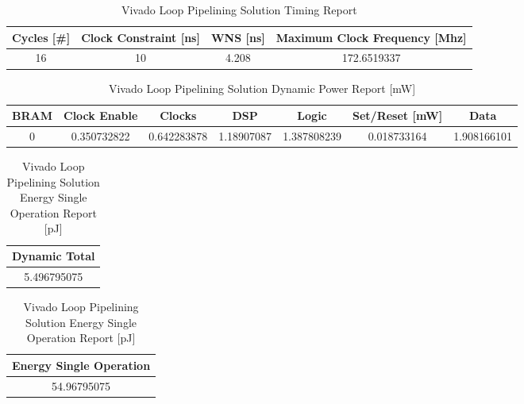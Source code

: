 \begin{table}[H]
    \centering
    \begin{tabular}{|c|c|c|c|}
        \hline
        \textbf{Cycles} [\#] & \textbf{Clock Constraint} [ns] & \textbf{WNS} [ns] & \textbf{Maximum Clock Frequency} [Mhz] \\
        \hline
        16 & 10 & 4.208 & 172.6519337 \\
        \hline
    \end{tabular}
    \caption{Vivado Loop Pipelining Solution Timing Report}
    \label{tab:vivado-loop-pipelining-solution-timing-reproot}
\end{table}

\begin{table}[H]
    \centering
    \begin{tabular}{|c|c|c|c|c|c|c|}
        \hline
        \textbf{BRAM} & \textbf{Clock Enable} & \textbf{Clocks} & \textbf{DSP} & \textbf{Logic} & \textbf{Set/Reset} [mW] & \textbf{Data} \\
        \hline
        0 & 0.350732822 & 0.642283878 & 1.18907087 & 1.387808239 & 0.018733164 & 1.908166101 \\
        \hline
    \end{tabular}
    \caption{Vivado Loop Pipelining Solution Dynamic Power Report [mW]}
    \label{tab:vivado-loop-pipelining-solution-dynamic-power-reproot}
\end{table}

\begin{table}[H]
    \centering
    \begin{minipage}[t]{0.45\linewidth}
        \centering
        \begin{tabular}{|c|}
            \hline
            \textbf{Dynamic Total} \\
            \hline
            5.496795075 \\
            \hline
        \end{tabular}
        \caption{Vivado Loop Pipelining Solution Dynamic Power Report [mW]}
        \label{tab:vivado-loop-pipelining-solution-dynamic-power-reproot}
    \end{minipage}
    \hfill
    \centering
    \begin{minipage}[t]{0.45\linewidth}
        \centering
        \begin{tabular}{|c|}
            \hline
            \textbf{Energy Single Operation} \\
            \hline
            54.96795075 \\
            \hline
        \end{tabular}
        \caption{Vivado Loop Pipelining Solution Energy Single Operation Report [pJ]}
        \label{tab:vivado-loop-pipelining-solution-energy-single-operation-reproot}
    \end{minipage}
\end{table}